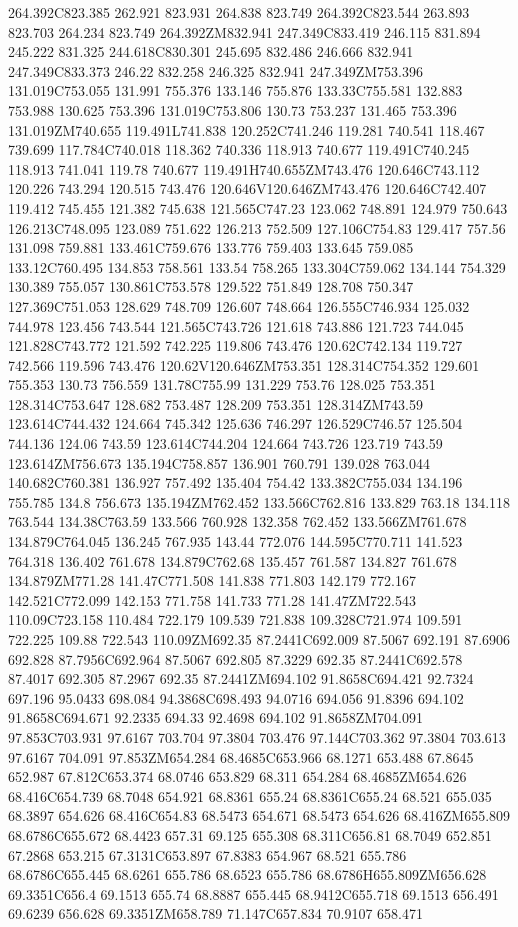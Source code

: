 264.392C823.385 262.921 823.931 264.838 823.749 264.392C823.544 263.893 823.703 264.234 823.749 264.392ZM832.941 247.349C833.419 246.115 831.894 245.222 831.325 244.618C830.301 245.695 832.486 246.666 832.941 247.349C833.373 246.22 832.258 246.325 832.941 247.349ZM753.396 131.019C753.055 131.991 755.376 133.146 755.876 133.33C755.581 132.883 753.988 130.625 753.396 131.019C753.806 130.73 753.237 131.465 753.396 131.019ZM740.655 119.491L741.838 120.252C741.246 119.281 740.541 118.467 739.699 117.784C740.018 118.362 740.336 118.913 740.677 119.491C740.245 118.913 741.041 119.78 740.677 119.491H740.655ZM743.476 120.646C743.112 120.226 743.294 120.515 743.476 120.646V120.646ZM743.476 120.646C742.407 119.412 745.455 121.382 745.638 121.565C747.23 123.062 748.891 124.979 750.643 126.213C748.095 123.089 751.622 126.213 752.509 127.106C754.83 129.417 757.56 131.098 759.881 133.461C759.676 133.776 759.403 133.645 759.085 133.12C760.495 134.853 758.561 133.54 758.265 133.304C759.062 134.144 754.329 130.389 755.057 130.861C753.578 129.522 751.849 128.708 750.347 127.369C751.053 128.629 748.709 126.607 748.664 126.555C746.934 125.032 744.978 123.456 743.544 121.565C743.726 121.618 743.886 121.723 744.045 121.828C743.772 121.592 742.225 119.806 743.476 120.62C742.134 119.727 742.566 119.596 743.476 120.62V120.646ZM753.351 128.314C754.352 129.601 755.353 130.73 756.559 131.78C755.99 131.229 753.76 128.025 753.351 128.314C753.647 128.682 753.487 128.209 753.351 128.314ZM743.59 123.614C744.432 124.664 745.342 125.636 746.297 126.529C746.57 125.504 744.136 124.06 743.59 123.614C744.204 124.664 743.726 123.719 743.59 123.614ZM756.673 135.194C758.857 136.901 760.791 139.028 763.044 140.682C760.381 136.927 757.492 135.404 754.42 133.382C755.034 134.196 755.785 134.8 756.673 135.194ZM762.452 133.566C762.816 133.829 763.18 134.118 763.544 134.38C763.59 133.566 760.928 132.358 762.452 133.566ZM761.678 134.879C764.045 136.245 767.935 143.44 772.076 144.595C770.711 141.523 764.318 136.402 761.678 134.879C762.68 135.457 761.587 134.827 761.678 134.879ZM771.28 141.47C771.508 141.838 771.803 142.179 772.167 142.521C772.099 142.153 771.758 141.733 771.28 141.47ZM722.543 110.09C723.158 110.484 722.179 109.539 721.838 109.328C721.974 109.591 722.225 109.88 722.543 110.09ZM692.35 87.2441C692.009 87.5067 692.191 87.6906 692.828 87.7956C692.964 87.5067 692.805 87.3229 692.35 87.2441C692.578 87.4017 692.305 87.2967 692.35 87.2441ZM694.102 91.8658C694.421 92.7324 697.196 95.0433 698.084 94.3868C698.493 94.0716 694.056 91.8396 694.102 91.8658C694.671 92.2335 694.33 92.4698 694.102 91.8658ZM704.091 97.853C703.931 97.6167 703.704 97.3804 703.476 97.144C703.362 97.3804 703.613 97.6167 704.091 97.853ZM654.284 68.4685C653.966 68.1271 653.488 67.8645 652.987 67.812C653.374 68.0746 653.829 68.311 654.284 68.4685ZM654.626 68.416C654.739 68.7048 654.921 68.8361 655.24 68.8361C655.24 68.521 655.035 68.3897 654.626 68.416C654.83 68.5473 654.671 68.5473 654.626 68.416ZM655.809 68.6786C655.672 68.4423 657.31 69.125 655.308 68.311C656.81 68.7049 652.851 67.2868 653.215 67.3131C653.897 67.8383 654.967 68.521 655.786 68.6786C655.445 68.6261 655.786 68.6523 655.786 68.6786H655.809ZM656.628 69.3351C656.4 69.1513 655.74 68.8887 655.445 68.9412C655.718 69.1513 656.491 69.6239 656.628 69.3351ZM658.789 71.147C657.834 70.9107 658.471 